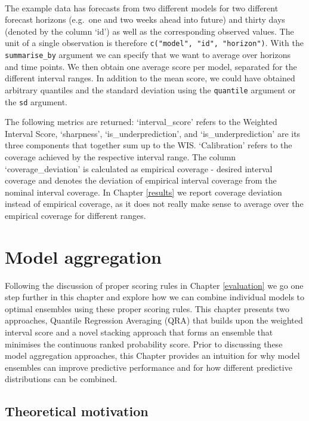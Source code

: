 \documentclass[
]{book}
\begin{document}
\(~\)

The example data has forecasts from two different models for two different forecast horizons (e.g.~one and two weeks ahead into future) and thirty days (denoted by the column `id') as well as the corresponding observed values. The unit of a single observation is therefore \texttt{c("model",\ "id",\ "horizon")}. With the \texttt{summarise\_by} argument we can specify that we want to average over horizons and time points. We then obtain one average score per model, separated for the different interval ranges. In addition to the mean score, we could have obtained arbitrary quantiles and the standard deviation using the \texttt{quantile} argument or the \texttt{sd} argument.

The following metrics are returned: `interval\_score' refers to the Weighted Interval Score, `sharpness', `is\_underprediction', and `is\_underprediction' are its three components that together sum up to the WIS. `Calibration' refers to the coverage achieved by the respective interval range. The column `coverage\_deviation' is calculated as empirical coverage - desired interval coverage and denotes the deviation of empirical interval coverage from the nominal interval coverage. In Chapter \ref{results} we report coverage deviation instead of empirical coverage, as it does not really make sense to average over the empirical coverage for different ranges.

\hypertarget{model-aggregation}{%
\chapter{Model aggregation}\label{model-aggregation}}

Following the discussion of proper scoring rules in Chapter \ref{evaluation} we go one step further in this chapter and explore how we can combine individual models to optimal ensembles using these proper scoring rules. This chapter presents two approaches, Quantile Regression Averaging (QRA) that builds upon the weighted interval score and a novel stacking approach that forms an ensemble that minimises the continuous ranked probability score. Prior to discussing these model aggregation approaches, this Chapter provides an intuition for why model ensembles can improve predictive performance and for how different predictive distributions can be combined.

\hypertarget{theoretical-motivation}{%
\section{Theoretical motivation}\label{theoretical-motivation}}
\end{document}
